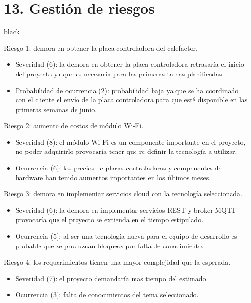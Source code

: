 \documentclass[
11pt, %
codirector, %
]{charter}
\begin{document}
\pagebreak
\section{13. Gestión de riesgos}
\label{sec:riesgos}

\begin{consigna}{black}

Riesgo 1: demora en obtener la placa controladora del calefactor.
\begin{itemize}
	\item Severidad (6): la demora en obtener la placa controladora retrasaría el inicio del proyecto ya que es necesaria para las primeras tareas planificadas.
	\item Probabilidad de ocurrencia (2): probabilidad baja ya que se ha coordinado con el cliente el envío de la placa controladora para que esté disponible en las primeras semanas de junio. 
\end{itemize}   

Riesgo 2: aumento de costos de módulo Wi-Fi.
\begin{itemize}
	\item Severidad (8): el módulo Wi-Fi es un componente importante en el proyecto, no poder adquirirlo provocaría tener que re definir la tecnología a utilizar. 
	\item Ocurrencia (6): los precios de placas controladoras y componentes de hardware han tenido aumentos importantes en los últimos meses.
\end{itemize}

Riesgo 3: demora en implementar servicios cloud con la tecnología seleccionada.
\begin{itemize}
	\item Severidad (6): la demora en implementar servicios REST y broker MQTT provocaría que el proyecto se extienda en el tiempo estipulado.
	\item Ocurrencia (5): al ser una tecnología nueva para el equipo de desarrollo es probable que se produzcan bloqueos por falta de conocimiento.
\end{itemize}

Riesgo 4: los requerimientos tienen una mayor complejidad que la esperada.
\begin{itemize}
	\item Severidad (7): el proyecto demandaría mas tiempo del estimado.
	\item Ocurrencia (3): falta de conocimientos del tema seleccionado.
\end{itemize}


\end{consigna}
\end{document}
